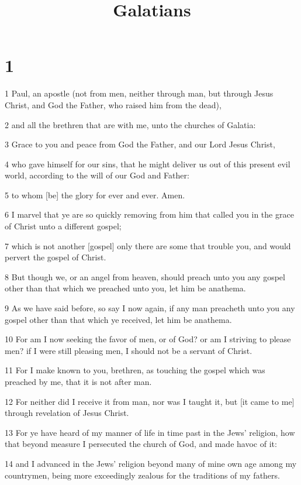 

\title{Galatians}

\chapter{1}

\par 1 Paul, an apostle (not from men, neither through man, but through Jesus Christ, and God the Father, who raised him from the dead),
\par 2 and all the brethren that are with me, unto the churches of Galatia:
\par 3 Grace to you and peace from God the Father, and our Lord Jesus Christ,
\par 4 who gave himself for our sins, that he might deliver us out of this present evil world, according to the will of our God and Father:
\par 5 to whom [be] the glory for ever and ever. Amen.
\par 6 I marvel that ye are so quickly removing from him that called you in the grace of Christ unto a different gospel;
\par 7 which is not another [gospel] only there are some that trouble you, and would pervert the gospel of Christ.
\par 8 But though we, or an angel from heaven, should preach unto you any gospel other than that which we preached unto you, let him be anathema.
\par 9 As we have said before, so say I now again, if any man preacheth unto you any gospel other than that which ye received, let him be anathema.
\par 10 For am I now seeking the favor of men, or of God? or am I striving to please men? if I were still pleasing men, I should not be a servant of Christ.
\par 11 For I make known to you, brethren, as touching the gospel which was preached by me, that it is not after man.
\par 12 For neither did I receive it from man, nor was I taught it, but [it came to me] through revelation of Jesus Christ.
\par 13 For ye have heard of my manner of life in time past in the Jews' religion, how that beyond measure I persecuted the church of God, and made havoc of it:
\par 14 and I advanced in the Jews' religion beyond many of mine own age among my countrymen, being more exceedingly zealous for the traditions of my fathers.

